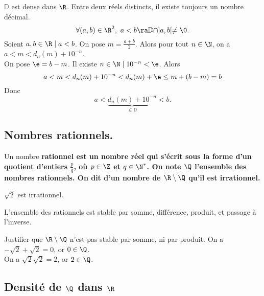 \documentclass[11pt]{article}
\renewcommand*{\D}{\mathbb{D}}
\begin{document}
\begin{corr}{$\D$ est dense dans $\R$.}{}
    Entre deux réels distincts, il existe toujours un nombre décimal.
    \begin{equation*}
        \forall (a,b)\in\R^2,~a<b\ra \D\cap]a,b[\neq\0.
    \end{equation*}
    \tcblower
    Soient $a,b\in\R\mid a<b$. On pose $m=\frac{a+b}{2}$. Alors pour tout $n\in\N$, on a $a<m<d_n(m)+10^{-n}$.\\
    On pose $\e=b-m$. Il existe $n\in\N\mid10^{-n}<\e$. Alors
    \begin{equation*}
        a<m<d_n(m)+10^{-n}<d_n(m)+\e\leq m+(b-m)=b
    \end{equation*}
    Donc
    \begin{equation*}
        a<\underbrace{d_n(m)+10^{-n}}_{\in\D}<b.
    \end{equation*}
\end{corr}

\subsection{Nombres rationnels.}

\begin{defi}{}{}
    Un nombre \bf{rationnel} est un nombre réel qui s'écrit sous la forme d'un quotient d'entiers $\frac{p}{q}$, où $p\in\Z$ et $q\in\N^*$. On note $\Q$ l'ensemble des nombres rationnels.\n
    On dit d'un nombre de $\R\setminus\Q$ qu'il est \bf{irrationnel}.
\end{defi}

\begin{prop}{}{}
    $\sqrt{2}$ est irrationnel.
\end{prop}

\begin{prop}{}{}
    L'ensemble des rationnels est stable par somme, différence, produit, et passage à l'inverse.
\end{prop}

\pagebreak

\begin{ex}{}{}
    Justifier que $\R\setminus\Q$ n'est pas stable par somme, ni par produit.
    \tcblower
    On a $-\sqrt{2}+\sqrt{2}=0$, or $0\in\Q$.\\
    On a $\sqrt{2}\sqrt{2}=2$, or $2\in\Q$.
\end{ex}

\subsection{Densité de \texorpdfstring{$\Q$}{Lg} dans \texorpdfstring{$\R$}{Lg}}
\end{document}
